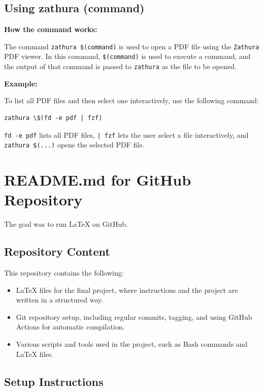 \documentclass{article}
\begin{document}
\subsection*{Using zathura (command)}

\textbf{How the command works:}

The command \texttt{zathura \$(command)} is used to open a PDF file using the \texttt{Zathura} PDF viewer. In this command, \texttt{\$(command)} is used to execute a command, and the output of that command is passed to \texttt{zathura} as the file to be opened.

\textbf{Example:}

To list all PDF files and then select one interactively, use the following command:

\begin{verbatim}
zathura \$(fd -e pdf | fzf)
\end{verbatim}

\texttt{fd -e pdf} lists all PDF files, \texttt{| fzf} lets the user select a file interactively, and \texttt{zathura \$(...)} opens the selected PDF file.








\section*{README.md for GitHub Repository}

The goal was to run LaTeX on GitHub.

\subsection*{Repository Content}

This repository contains the following:

\begin{itemize}
    \item LaTeX files for the final project, where instructions and the project are written in a structured way.
    \item Git repository setup, including regular commits, tagging, and using GitHub Actions for automatic compilation.
    \item Various scripts and tools used in the project, such as Bash commands and LaTeX files.
\end{itemize}

\subsection*{Setup Instructions}
\end{document}
